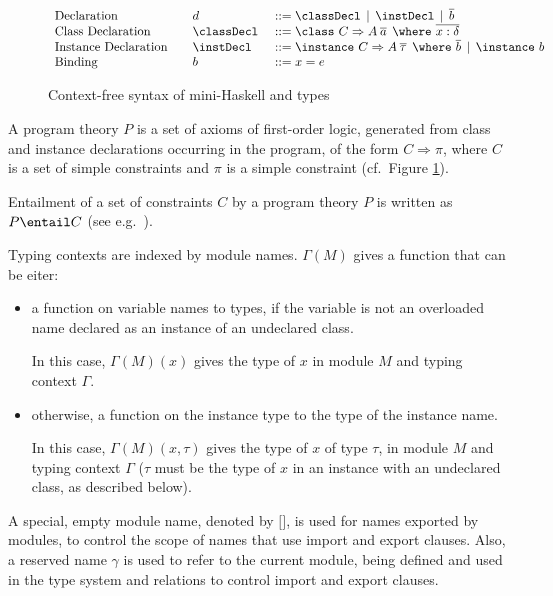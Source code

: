 \begin{figure}
\[\begin{array}[c]{llll}
\textrm{Declaration}        &         & d              & ::= \classDecl \,\mid\, \instDecl \,\mid\, \overline{b}\\
\textrm{Class Declaration}  &         & \classDecl\    & ::= \class\ C \Rightarrow A\: \overline{a}\:\: \where\ \overline{x:\delta}\\
\textrm{Instance Declaration} &       & \instDecl\     & ::= \instance\ C \Rightarrow A\: \overline{\tau}\:\: \where\ \overline{b} 
                                                             \,\mid\, \instance\ b\\
\textrm{Binding}              &       & b              & ::= x = e 
\end{array} \]
\caption{Context-free syntax of mini-Haskell and types}
\label{fig:mini-Haskell-context-free-syntax}
\end{figure}

A program theory $P$ is a set of axioms of first-order logic,
generated from class and instance declarations occurring in the
program, of the form $C \Rightarrow \pi$, where $C$ is a set of simple
constraints and $\pi$ is a simple constraint (cf.~Figure
\ref{fig:mini-Haskell-context-free-syntax}).

Entailment of a set of constraints $C$ by a program theory $P$ is
written as $P \entail C$ (see
e.g.~\cite{JBCS-Ambiguity-and-constrained-polymorphism}).

Typing contexts are indexed by module names. $\Gamma(M)$ gives a
function that can be eiter:

  \begin{itemize}

    \item a function on variable names to types, if the variable is
      not an overloaded name declared as an instance of an undeclared
      class. 

     In this case, $\Gamma(M)(x)$ gives the type of $x$ in module $M$
     and typing context $\Gamma$.

    \item otherwise, a function on the instance type to the type of
      the instance name. 

     In this case, $\Gamma(M)(x,\tau)$ gives the type of $x$ of type
     $\tau$, in module $M$ and typing context $\Gamma$ ($\tau$ must be
     the type of $x$ in an instance with an undeclared class, as
     described below).

  \end{itemize}
   
A special, empty module name, denoted by $\texttt{[]}$, is used for
names exported by modules, to control the scope of names that use
import and export clauses. Also, a reserved name $\gamma$ is used to
refer to the current module, being defined and used in the type system
and relations to control import and export clauses.

